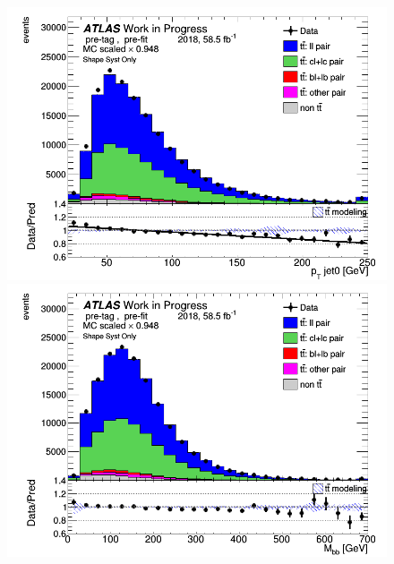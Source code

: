 \documentclass[letterpaper,12pt]{article}
\begin{document}
\begin{figure}[H]
\begin{minipage}[b]{.45\textwidth}
\end{minipage}\hfill
\begin{minipage}[b]{.45\textwidth}
\centering
\includegraphics[width=1\textwidth]{Distribution_March_highpT/DataMC_J0_pt.png}
\end{minipage}\hfill
\begin{minipage}[b]{.45\textwidth}
\centering
\includegraphics[width=1\textwidth]{Distribution_March_highpT/DataMC_Mbb.png}
\end{minipage}\hfill

\end{figure}
\end{document}
